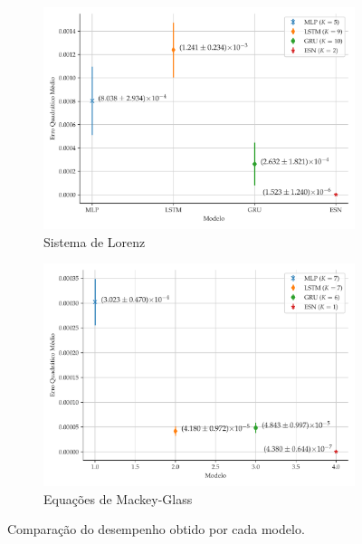 \documentclass[aspectratio=169]{beamer}
\begin{document}
\begin{frame}
\begin{figure}[!h]
     \centering\\
     \begin{subfigure}[t]{0.4\textwidth}
     \centering
         \includegraphics[scale=0.15]{comparacao-k-lorenz.pdf}
         \caption{Sistema de Lorenz}
     \end{subfigure}
     \centering
     \begin{subfigure}[t]{0.4\textwidth} 
     \centering
         \includegraphics[scale=0.15]{comparacao-k-mackeyglass.pdf}
         \caption{Equações de Mackey-Glass}
     \end{subfigure}  
     \centering   
     \caption{Comparação do desempenho obtido por cada modelo.}
     \label{fig:model-comparison}
\end{figure}
\end{frame}
\end{document}
